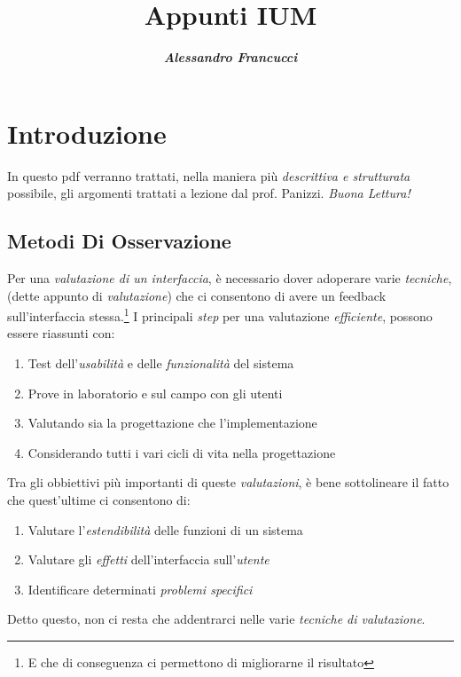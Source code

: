 \documentclass[oneside]{book}
\title{Appunti IUM}
\author{\textbf{\emph{Alessandro Francucci}}}
\begin{document}
\begin{titlepage}
\maketitle
\thispagestyle{empty}
\end{titlepage}

\tableofcontents


\chapter*{Introduzione}
	In questo pdf verranno trattati, nella maniera più \emph{descrittiva e strutturata} possibile, gli argomenti trattati a lezione dal prof. Panizzi. \emph{Buona Lettura!}

	\section*{Metodi Di Osservazione}
		Per una \emph{valutazione di un interfaccia}, è necessario dover adoperare varie \emph{tecniche}, (dette appunto di \emph{valutazione}) che ci consentono di avere un feedback sull'interfaccia stessa.\footnote{E che di conseguenza ci permettono di migliorarne il risultato} I principali \emph{step} per una valutazione \emph{efficiente}, possono essere riassunti con:
		\begin{enumerate}
			\item Test dell'\emph{usabilità} e delle \emph{funzionalità} del sistema
			\item Prove in laboratorio e sul campo con gli utenti
			\item Valutando sia la progettazione che l'implementazione
			\item Considerando tutti i vari cicli di vita nella progettazione
		\end{enumerate}
		Tra gli obbiettivi più importanti di queste \emph{valutazioni}, è bene sottolineare il fatto che quest'ultime ci consentono di:
		\begin{enumerate}
			\item Valutare l'\emph{estendibilità} delle funzioni di un sistema
			\item Valutare gli \emph{effetti} dell'interfaccia sull'\emph{utente}
			\item Identificare determinati \emph{problemi specifici}
		\end{enumerate}
		Detto questo, non ci resta che addentrarci nelle varie \emph{tecniche di valutazione}.
\end{document}
